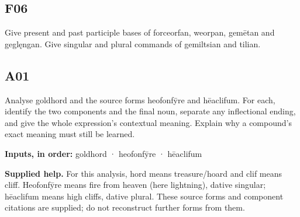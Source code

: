 \par\begin{minipage}{\linewidth}\raggedright
\subsection*{F06}

Give present and past participle bases of forceorfan, weorpan, gemētan and geglęngan. Give singular and plural commands of gemiltsian and tilian.

\end{minipage}\par\addvspace{4pt}

\par\begin{minipage}{\linewidth}\raggedright
\subsection*{A01}

Analyse goldhord and the source forms heofonfȳre and hēaclifum. For each, identify the two components and the final noun, separate any inflectional ending, and give the whole expression’s contextual meaning. Explain why a compound’s exact meaning must still be learned.

\textbf{Inputs, in order:} goldhord · heofonfȳre · hēaclifum

\end{minipage}\par\addvspace{4pt}

\textbf{Supplied help.} For this analysis, hord means treasure/\allowbreak{}hoard and clif means cliff. Heofonfȳre means fire from heaven (here lightning), dative singular; hēaclifum means high cliffs, dative plural. These source forms and component citations are supplied; do not reconstruct further forms from them.

